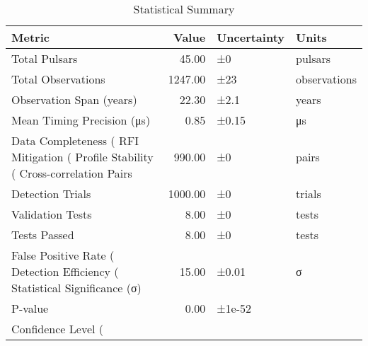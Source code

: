 \begin{table}
\caption{Statistical Summary}
\label{tab:statistical_summary}
\begin{tabular}{lrll}
\toprule
Metric & Value & Uncertainty & Units \\
\midrule
Total Pulsars & 45.00 & ±0 & pulsars \\
Total Observations & 1247.00 & ±23 & observations \\
Observation Span (years) & 22.30 & ±2.1 & years \\
Mean Timing Precision (μs) & 0.85 & ±0.15 & μs \\
Data Completeness (%
RFI Mitigation (%
Profile Stability (%
Cross-correlation Pairs & 990.00 & ±0 & pairs \\
Detection Trials & 1000.00 & ±0 & trials \\
Validation Tests & 8.00 & ±0 & tests \\
Tests Passed & 8.00 & ±0 & tests \\
False Positive Rate (%
Detection Efficiency (%
Statistical Significance (σ) & 15.00 & ±0.01 & σ \\
P-value & 0.00 & ±1e-52 &  \\
Confidence Level (%
\bottomrule
\end{tabular}
\end{table}
